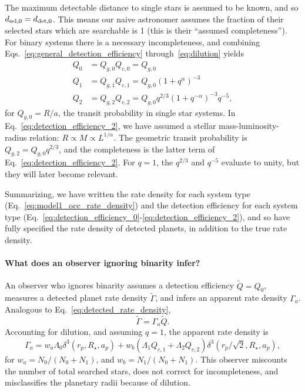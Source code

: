 The maximum detectable distance to single stars is assumed to be known, and so 
$d_{{\rm sel},0} = d_{{\rm det},0}$.
This means our naive astronomer assumes the fraction of their selected stars 
which are searchable is 1 (this is their ``assumed completeness'').
For binary systems there is a necessary incompleteness, and combining 
Eqs.~\ref{eq:general_detection_efficiency} through~\ref{eq:dilution} yields
\begin{align}
Q_0 &= Q_{g,0}Q_{c,0} = Q_{g,0} \label{eq:detection_efficiency_0}\\
Q_1 &= Q_{g,1}Q_{c,1} = Q_{g,0} (1+q^\alpha)^{-3} \\
Q_2 &= Q_{g,2}Q_{c,2} = Q_{g,0} q^{2/3} (1+q^{-\alpha})^{-3} q^{-5}, 
\label{eq:detection_efficiency_2}
\end{align}
for $Q_{g,0}=R/a$, the transit probability in single star systems.
In Eq.~\ref{eq:detection_efficiency_2}, we have assumed a stellar 
mass-luminosity-radius relation: $R\propto M \propto L^{1/\alpha}$.
The geometric transit probability is $Q_{g,2} = Q_{g,0}q^{2/3}$, and the 
completeness is the latter term of Eq.~\ref{eq:detection_efficiency_2}.
For $q=1$, the $q^{2/3}$ and $q^{-5}$ evaluate to unity, but they will later 
become relevant.

Summarizing, we have written the rate density for each system type
(Eq.~\ref{eq:model1_occ_rate_density}) and the detection efficiency for each 
system type 
(Eq.~\ref{eq:detection_efficiency_0}-\ref{eq:detection_efficiency_2}),
and so have fully specified the rate density of detected planets, 
in addition to the true rate density.


\paragraph{What does an observer ignoring binarity infer?} 
An observer who ignores binarity assumes a detection efficiency 
$\tilde{Q}=Q_0$,
measures a detected planet rate density $\tilde{\Gamma}$, 
and infers an apparent rate density $\Gamma_a$.
Analogous to Eq.~\ref{eq:detected_rate_density},
\begin{equation}
\tilde{\Gamma} = \Gamma_a \tilde{Q}.
\end{equation}
Accounting for dilution, and assuming $q=1$, the apparent rate density is
\begin{equation}
\Gamma_a = 
w_a \Lambda_0 \delta^3(r_p, R_\star, a_p) +
w_b (\Lambda_1 Q_{c,1} + \Lambda_2 Q_{c,2}) 
				\delta^3(r_p/\sqrt{2}, R_\star, a_p),
\end{equation}
for $w_a = N_0/(N_0+N_1)$, and $w_b = N_1/(N_0+N_1)$.
This observer miscounts the number of total searched stars, does not correct 
for incompleteness, and misclassifies the planetary radii because of dilution.

